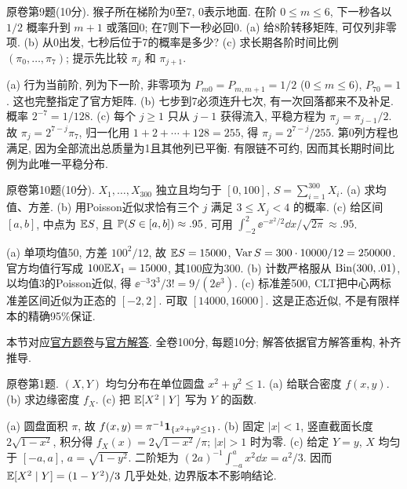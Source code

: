 \begin{exercise}\label{ex:fl17-9}
原卷第9题(10分). 猴子所在梯阶为0至7, 0表示地面. 在阶 $0\leq m\leq6$, 下一秒各以 $1/2$ 概率升到 $m+1$ 或落回0; 在7则下一秒必回0. (a) 给8阶转移矩阵, 可仅列非零项. (b) 从0出发, 七秒后位于7的概率是多少? (c) 求长期各阶时间比例 $(\pi_0,\ldots,\pi_7)$; 提示先比较 $\pi_j$ 和 $\pi_{j+1}$.
\end{exercise}
\begin{solution}
(a)\label{sol:fl17-9-a} 行为当前阶, 列为下一阶, 非零项为 $P_{m0}=P_{m,m+1}=1/2$ ($0\leq m\leq6$), $P_{70}=1$. 这也完整指定了官方矩阵.
(b)\label{sol:fl17-9-b} 七步到7必须连升七次, 有一次回落都来不及补足. 概率 $2^{-7}=1/128$.
(c)\label{sol:fl17-9-c} 每个 $j\geq1$ 只从 $j-1$ 获得流入, 平稳方程为 $\pi_j=\pi_{j-1}/2$. 故 $\pi_j=2^{7-j}\pi_7$, 归一化用 $1+2+\cdots+128=255$, 得 $\pi_j=2^{7-j}/255$. 第0列方程也满足, 因为全部流出总质量为1且其他列已平衡. 有限链不可约, 因而其长期时间比例为此唯一平稳分布.
\end{solution}

\begin{exercise}\label{ex:fl17-10}
原卷第10题(10分). $X_1,\ldots,X_{300}$ 独立且均匀于 $[0,100]$, $S=\sum_{i=1}^{300}X_i$. (a) 求均值、方差. (b) 用Poisson近似求恰有三个 $j$ 满足 $3\leq X_j<4$ 的概率. (c) 给区间 $[a,b]$, 中点为 $\mathbb E S$, 且 $\mathbb P(S\in[a,b])\approx.95$. 可用 $\int_{-2}^2\ee^{-x^2/2}\dd x/\sqrt{2\pi}\approx.95$.
\end{exercise}
\begin{solution}
(a)\label{sol:fl17-10-a} 单项均值50, 方差 $100^2/12$, 故 $\mathbb E S=15000$, $\operatorname{Var} S=300\cdot10000/12=250000$. 官方均值行写成 $100\mathbb E X_1=15000$, 其100应为300.
(b)\label{sol:fl17-10-b} 计数严格服从 $\operatorname{Bin}(300,.01)$, 以均值3的Poisson近似, 得 $\ee^{-3}3^3/3!=9/(2\ee^3)$.
(c)\label{sol:fl17-10-c} 标准差500, CLT把中心两标准差区间近似为正态的 $[-2,2]$. 可取 $[14000,16000]$. 这是正态近似, 不是有限样本的精确95\%保证.
\end{solution}

本节对应\href{https://ocw.mit.edu/courses/18-600-probability-and-random-variables-fall-2019/resources/mit18_600f19_final_2018/}{官方题卷}与\href{https://ocw.mit.edu/courses/18-600-probability-and-random-variables-fall-2019/resources/mit18_600f19_final_2018_soln/}{官方解答}. 全卷100分, 每题10分; 解答依据官方解答重构, 补齐推导.

\begin{exercise}\label{ex:fl18-1}
原卷第1题. $(X,Y)$ 均匀分布在单位圆盘 $x^2+y^2\leq1$. (a) 给联合密度 $f(x,y)$. (b) 求边缘密度 $f_X$. (c) 把 $\mathbb E[X^2\mid Y]$ 写为 $Y$ 的函数.
\end{exercise}
\begin{solution}
(a)\label{sol:fl18-1-a} 圆盘面积 $\pi$, 故 $f(x,y)=\pi^{-1}\mathbf 1_{\{x^2+y^2\leq1\}}$.
(b)\label{sol:fl18-1-b} 固定 $|x|<1$, 竖直截面长度 $2\sqrt{1-x^2}$, 积分得 $f_X(x)=2\sqrt{1-x^2}/\pi$; $|x|>1$ 时为零.
(c)\label{sol:fl18-1-c} 给定 $Y=y$, $X$ 均匀于 $[-a,a]$, $a=\sqrt{1-y^2}$. 二阶矩为 $(2a)^{-1}\int_{-a}^a x^2\dd x=a^2/3$. 因而 $\mathbb E[X^2\mid Y]=(1-Y^2)/3$ 几乎处处, 边界版本不影响结论.
\end{solution}

